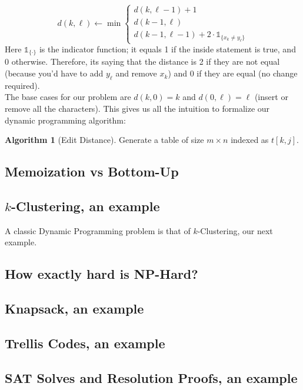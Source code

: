 \documentclass[11pt]{article}
\theoremstyle{plain}
\theoremstyle{definition}
\newtheorem{alg}[thm]{Algorithm}
\newcommand{\One}[1]{\mathds{1}_{\{ #1 \}}}
\numberwithin{equation}{section}
\numberwithin{figure}{section}
\begin{document}
\begin{equation}
d(k,\ell) \leftarrow \min \begin{cases} d(k, \ell - 1) + 1\\ d(k - 1, \ell) \\ d(k-1, \ell - 1) + 2 \cdot \One{x_k \neq y_\ell} \end{cases}
\end{equation} 
Here $\One{\cdot}$ is the indicator function; it equals 1 if the inside statement is true, and 0 otherwise. Therefore, its saying that the distance is 2 if they are not equal (because you'd have to add $y_\ell$ and remove $x_k$) and 0 if they are equal (no change required). \\

\noindent The base cases for our problem are $d(k,0) = k$ and $d(0,\ell) = \ell$ (insert or remove all the characters). This gives us all the intuition to formalize our dynamic programming algorithm:

\begin{alg}[Edit Distance]
Generate a table of size $m \times n$ indexed as $t[k,j]$. 
\end{alg}

\subsection{Memoization vs Bottom-Up}

\subsection{$k$-Clustering, an example}
A classic Dynamic Programming problem is that of $k$-Clustering, our next example.

\subsection{How exactly hard is NP-Hard?}

\subsection{Knapsack, an example}

\subsection{Trellis Codes, an example}

\subsection{SAT Solves and Resolution Proofs, an example}
\end{document}
